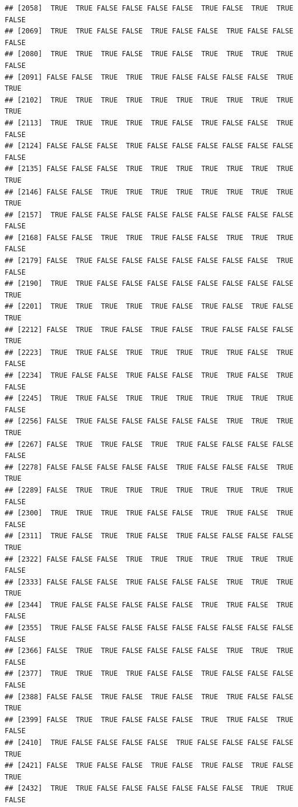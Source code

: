\documentclass{article}\usepackage[]{graphicx}\usepackage[]{color}
\makeatletter
\newenvironment{kframe}{%
 \def\at@end@of@kframe{}%
 \ifinner\ifhmode%
  \def\at@end@of@kframe{\end{minipage}}%
  \begin{minipage}{\columnwidth}%
 \fi\fi%
 \def\FrameCommand##1{\hskip\@totalleftmargin \hskip-\fboxsep
 \colorbox{shadecolor}{##1}\hskip-\fboxsep
     \hskip-\linewidth \hskip-\@totalleftmargin \hskip\columnwidth}%
 \MakeFramed {\advance\hsize-\width
   \@totalleftmargin\z@ \linewidth\hsize
   \@setminipage}}%
 {\par\unskip\endMakeFramed%
 \at@end@of@kframe}
\newenvironment{knitrout}{}{} %
\makeatother
\begin{document}
\begin{knitrout}
\begin{kframe}
\begin{verbatim}
## [2058]  TRUE  TRUE FALSE FALSE FALSE FALSE  TRUE FALSE  TRUE  TRUE FALSE
## [2069]  TRUE  TRUE FALSE FALSE  TRUE FALSE FALSE  TRUE FALSE FALSE FALSE
## [2080]  TRUE  TRUE  TRUE FALSE  TRUE FALSE  TRUE  TRUE  TRUE  TRUE FALSE
## [2091] FALSE FALSE  TRUE  TRUE  TRUE FALSE FALSE FALSE FALSE  TRUE  TRUE
## [2102]  TRUE  TRUE  TRUE  TRUE  TRUE  TRUE  TRUE  TRUE  TRUE  TRUE  TRUE
## [2113]  TRUE  TRUE  TRUE  TRUE  TRUE FALSE  TRUE FALSE FALSE  TRUE FALSE
## [2124] FALSE FALSE FALSE  TRUE FALSE FALSE FALSE FALSE FALSE FALSE FALSE
## [2135] FALSE FALSE FALSE  TRUE  TRUE  TRUE  TRUE  TRUE  TRUE  TRUE  TRUE
## [2146] FALSE FALSE  TRUE  TRUE  TRUE  TRUE  TRUE  TRUE  TRUE  TRUE  TRUE
## [2157]  TRUE FALSE FALSE FALSE FALSE FALSE FALSE FALSE FALSE FALSE FALSE
## [2168] FALSE FALSE  TRUE  TRUE  TRUE FALSE FALSE  TRUE  TRUE  TRUE FALSE
## [2179] FALSE  TRUE FALSE FALSE FALSE FALSE FALSE FALSE FALSE  TRUE FALSE
## [2190]  TRUE  TRUE FALSE FALSE FALSE FALSE FALSE FALSE FALSE FALSE  TRUE
## [2201]  TRUE  TRUE  TRUE  TRUE  TRUE FALSE  TRUE FALSE  TRUE FALSE  TRUE
## [2212] FALSE  TRUE  TRUE FALSE  TRUE FALSE  TRUE FALSE FALSE FALSE  TRUE
## [2223]  TRUE  TRUE FALSE  TRUE  TRUE  TRUE  TRUE  TRUE FALSE  TRUE FALSE
## [2234]  TRUE FALSE FALSE  TRUE FALSE FALSE  TRUE  TRUE FALSE  TRUE FALSE
## [2245]  TRUE  TRUE FALSE  TRUE  TRUE  TRUE  TRUE  TRUE  TRUE  TRUE FALSE
## [2256] FALSE  TRUE FALSE FALSE FALSE FALSE FALSE  TRUE  TRUE  TRUE  TRUE
## [2267] FALSE  TRUE  TRUE FALSE  TRUE  TRUE FALSE FALSE FALSE FALSE FALSE
## [2278] FALSE FALSE FALSE FALSE FALSE  TRUE FALSE FALSE FALSE  TRUE  TRUE
## [2289] FALSE  TRUE  TRUE  TRUE  TRUE  TRUE  TRUE  TRUE  TRUE  TRUE FALSE
## [2300]  TRUE  TRUE  TRUE  TRUE FALSE FALSE  TRUE  TRUE FALSE  TRUE FALSE
## [2311]  TRUE FALSE  TRUE  TRUE FALSE  TRUE FALSE FALSE FALSE FALSE  TRUE
## [2322] FALSE FALSE FALSE  TRUE  TRUE  TRUE  TRUE  TRUE  TRUE  TRUE FALSE
## [2333] FALSE FALSE FALSE  TRUE FALSE FALSE FALSE  TRUE  TRUE  TRUE  TRUE
## [2344]  TRUE FALSE FALSE FALSE FALSE FALSE  TRUE  TRUE FALSE  TRUE FALSE
## [2355]  TRUE FALSE FALSE FALSE FALSE FALSE FALSE FALSE FALSE FALSE FALSE
## [2366] FALSE  TRUE  TRUE FALSE FALSE FALSE FALSE  TRUE  TRUE  TRUE FALSE
## [2377]  TRUE  TRUE  TRUE  TRUE FALSE FALSE  TRUE FALSE FALSE FALSE FALSE
## [2388] FALSE FALSE  TRUE FALSE  TRUE FALSE  TRUE  TRUE FALSE FALSE  TRUE
## [2399] FALSE  TRUE  TRUE FALSE FALSE FALSE  TRUE  TRUE FALSE  TRUE FALSE
## [2410]  TRUE FALSE FALSE FALSE FALSE  TRUE FALSE FALSE FALSE FALSE  TRUE
## [2421] FALSE  TRUE FALSE FALSE  TRUE FALSE  TRUE FALSE  TRUE FALSE  TRUE
## [2432]  TRUE  TRUE FALSE FALSE FALSE FALSE FALSE FALSE  TRUE  TRUE FALSE

\end{verbatim}
\end{kframe}
\end{knitrout}
\end{document}
